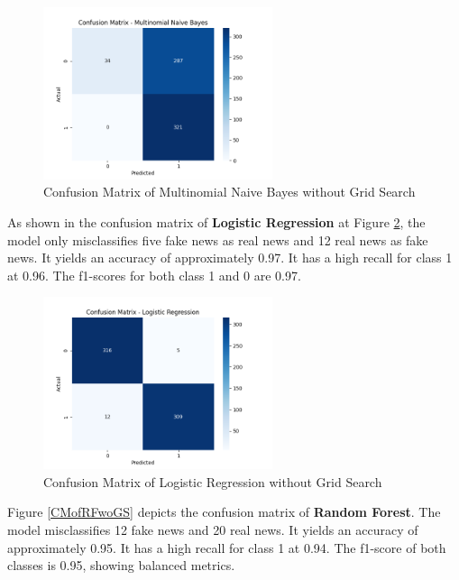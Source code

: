 \begin{figure}[ht]
\centering
\includegraphics[width=0.6\textwidth,height=0.6\textheight, keepaspectratio]{figures/withoutgridsearch/NB.png}
  \caption{Confusion Matrix of Multinomial Naive Bayes without Grid Search}
  \label{CMofMNBwoGS}
\end{figure}

As shown in the confusion matrix of \textbf{Logistic Regression} at Figure \ref{CMofLRwoGS}, the model only misclassifies five fake news as real news and 12 real news as fake news. It yields an accuracy of approximately 0.97. It has a high recall for class 1 at 0.96. The f1-scores for both class 1 and 0 are 0.97.

\begin{figure}[ht]
\centering
\includegraphics[width=0.6\textwidth,height=0.6\textheight, keepaspectratio]{figures/withoutgridsearch/LR.png}
  \caption{Confusion Matrix of Logistic Regression without Grid Search}
  \label{CMofLRwoGS}
\end{figure}

\clearpage

Figure \ref{CMofRFwoGS} depicts the confusion matrix of \textbf{Random Forest}. The model misclassifies 12 fake news and 20 real news. It yields an accuracy of approximately 0.95. It has a high recall for class 1 at 0.94. The f1-score of both classes is 0.95, showing balanced metrics.

